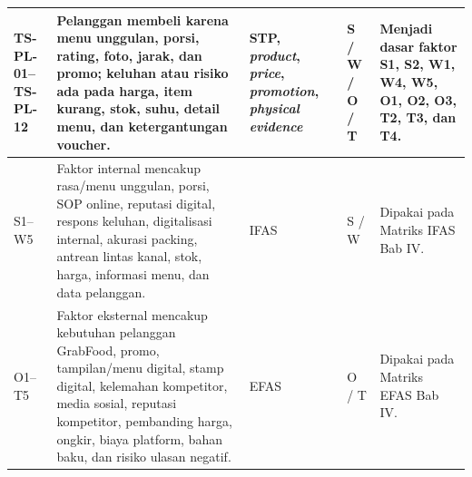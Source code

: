 \begin{table}[!htbp]
\begin{tabularx}{\textwidth}{|Z{1.8cm}|Y|Y|Y|Y|}
        TS-PL-01--TS-PL-12 & Pelanggan membeli karena menu unggulan, porsi, rating, foto, jarak, dan promo; keluhan atau risiko ada pada harga, item kurang, stok, suhu, detail menu, dan ketergantungan voucher. & STP, \textit{product}, \textit{price}, \textit{promotion}, \textit{physical evidence} & S / W / O / T & Menjadi dasar faktor S1, S2, W1, W4, W5, O1, O2, O3, T2, T3, dan T4. \\ \hline
        S1--W5 & Faktor internal mencakup rasa/menu unggulan, porsi, SOP online, reputasi digital, respons keluhan, digitalisasi internal, akurasi packing, antrean lintas kanal, stok, harga, informasi menu, dan data pelanggan. & IFAS & S / W & Dipakai pada Matriks IFAS Bab IV. \\ \hline
        O1--T5 & Faktor eksternal mencakup kebutuhan pelanggan GrabFood, promo, tampilan/menu digital, stamp digital, kelemahan kompetitor, media sosial, reputasi kompetitor, pembanding harga, ongkir, biaya platform, bahan baku, dan risiko ulasan negatif. & EFAS & O / T & Dipakai pada Matriks EFAS Bab IV. \\ \hline
        \bottomrule
    \end{tabularx}
\end{table}
